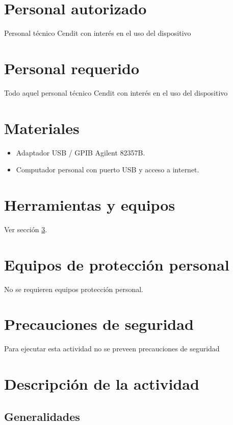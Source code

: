 \documentclass[paper=letter,oneside,fontsize=11pt, parskip=full]{scrartcl}
\begin{document}
	\section{Personal autorizado}
	
		Personal técnico Cendit con interés en el uso del dispositivo
		
	\section{Personal requerido}
	
		Todo aquel personal técnico Cendit con interés en el uso del dispositivo
		
	\section{Materiales}
		\label{Sec:SeccionMateriales}
		\begin{itemize}
			\item Adaptador USB / GPIB Agilent 82357B.
			\item Computador personal con puerto USB y acceso a internet.
		\end{itemize}	
			
	\section{Herramientas y equipos}
		
		Ver sección \ref{Sec:SeccionMateriales}.

	
	\section{Equipos de protección personal}
	
		No se requieren equipos protección personal.
		
	\section{Precauciones de seguridad}
	
		Para ejecutar esta actividad no se preveen precauciones de seguridad
		
	\section{Descripción de la actividad}
	
		\subsection{Generalidades}
	
\end{document}
